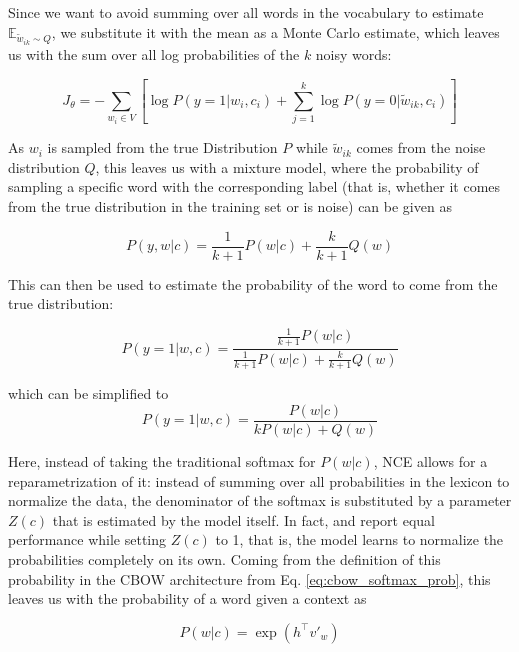 \documentclass[11pt]{article}
\begin{document}
Since we want to avoid summing over all words in the vocabulary to estimate $ \mathbb{E}_{\tilde{w}_{ik}\sim Q}$, we substitute it with the mean as a Monte Carlo estimate, which leaves us with the sum over all log probabilities of the $k$ noisy words:

\begin{equation}
J_{\theta}  = - \sum_{w_i \in V} [\log P(y=1|w_i,c_i) + \sum_{j=1}^{k}\log P (y = 0|\tilde{w}_{ik},c_i)]
\label{eq:nce_2}
\end{equation}

As $w_i$ is sampled from the true Distribution $P$ while $\tilde{w}_{ik}$ comes from the noise distribution $Q$, this leaves us with a mixture model, where the probability of sampling a specific word with the corresponding label (that is, whether it comes from the true distribution in the training set or is noise) can be given as 

\begin{equation}
P(y,w|c) = \frac{1}{k+1}P(w|c)+\frac{k}{k+1}Q(w)\label{eq:nce_3}
\end{equation}

This can then be used to estimate the probability of the word to come from the true distribution:

\begin{equation}
P(y=1|w,c) = \frac{\frac{1}{k+1}P(w|c)}{\frac{1}{k+1}P(w|c)+\frac{k}{k+1}Q(w)}
\label{eq:nce_4}
\end{equation}

which can be simplified to
\begin{equation}
P(y=1|w,c) = \frac{P(w|c)}{kP(w|c)+Q(w)}
\label{eq:nce_5}
\end{equation}

Here, instead of taking the traditional softmax for  $P(w|c)$, NCE allows for a reparametrization of it: instead of summing over all probabilities in the lexicon to normalize the data, the denominator of the softmax is substituted by a parameter $Z(c)$ that is estimated by the model itself. In fact, and report equal performance while setting $Z(c)$ to 1, that is, the model learns to normalize the probabilities completely on its own. Coming from the definition of this probability in the CBOW architecture from Eq. \ref{eq:cbow_softmax_prob}, this leaves us with the probability of a word given a context as 

\begin{equation}
P(w|c) = \exp (h^{\top}v'_w)
\label{eq:nce_6}
\end{equation}
\end{document}
